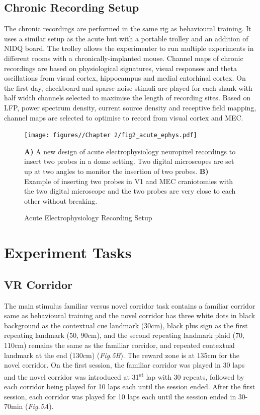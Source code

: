 \subsection{Chronic Recording Setup}
The chronic recordings are performed in the same rig as behavioural training. It uses a similar setup as the acute but with a portable trolley and an addition of NIDQ board. The trolley allows the experimenter to run multiple experiments in different rooms with a chronically-implanted mouse. Channel maps of chronic recordings are based on physiological signatures, visual responses and theta oscillations from visual cortex, hippocampus and medial entorhinal cortex. On the first day, checkboard and sparse noise stimuli are played for each shank with half width channels selected to maximise the length of recording sites. Based on LFP, power spectrum density, current source density and receptive field mapping, channel maps are selected to optimise to record from visual cortex and MEC.
\begin{figure}
    \centering
    \texttt{[image: figures//Chapter 2/fig2\_acute\_ephys.pdf]}
    \caption{Acute Electrophysiology Recording Setup}
    \label{fig:placeholder}
\textbf{A)} A new design of acute electrophysiology neuropixel recordings to insert two probes in a dome setting. Two digital microscopes are set up at two angles to monitor the insertion of two probes. \textbf{B)} Example of inserting two probes in V1 and MEC craniotomies with the two digital microscope and the two probes are very close to each other without breaking.
\end{figure}
\section{Experiment Tasks}
\subsection{VR Corridor}
The main stimulus familiar versus novel corridor task contains a familiar corridor same as behavioural training and the novel corridor has three white dots in black background as the contextual cue landmark (30cm), black plus sign as the first repeating landmark (50, 90cm), and the second repeating landmark plaid (70, 110cm) remains the same as the familiar corridor, and repeated contextual landmark at the end (130cm) (\textit{Fig.5B}). The reward zone is at 135cm for the novel corridor. On the first session, the familiar corridor was played in 30 laps and the novel corridor was introduced at 31\textsuperscript{st} lap with 30 repeats, followed by each corridor being played for 10 laps each until the session ended. After the first session, each corridor was played for 10 laps each until the session ended in 30-70min (\textit{Fig.5A}). 

